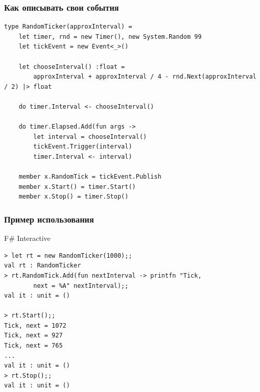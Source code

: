 \documentclass{../../slides-style}
\begin{document}
    \begin{frame}[fragile]
        \frametitle{Как описывать свои события}
        \begin{footnotesize}
            \begin{verbatim}
type RandomTicker(approxInterval) =
    let timer, rnd = new Timer(), new System.Random 99
    let tickEvent = new Event<_>()

    let chooseInterval() :float =
        approxInterval + approxInterval / 4 - rnd.Next(approxInterval / 2) |> float

    do timer.Interval <- chooseInterval()

    do timer.Elapsed.Add(fun args ->
        let interval = chooseInterval()
        tickEvent.Trigger(interval)
        timer.Interval <- interval)

    member x.RandomTick = tickEvent.Publish
    member x.Start() = timer.Start()
    member x.Stop() = timer.Stop()
            \end{verbatim}
        \end{footnotesize}
    \end{frame}

    \begin{frame}[fragile]
        \frametitle{Пример использования}
        \begin{alertblock}{F\# Interactive}
            \begin{verbatim}
> let rt = new RandomTicker(1000);;
val rt : RandomTicker
> rt.RandomTick.Add(fun nextInterval -> printfn "Tick, 
        next = %A" nextInterval);;
val it : unit = ()

> rt.Start();;
Tick, next = 1072
Tick, next = 927
Tick, next = 765
...
val it : unit = ()
> rt.Stop();;
val it : unit = ()
            \end{verbatim}
        \end{alertblock}
    \end{frame}
\end{document}
